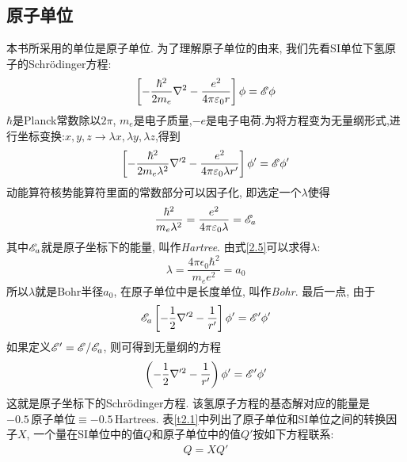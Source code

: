 \subsection{原子单位}
\label{sec2.1.1}
本书所采用的单位是原子单位. 
为了理解原子单位的由来,
我们先看SI单位下氢原子的Schr\"odinger方程:
\begin{align}
\label{2.3}
\left[-\frac{\hbar^2}{2m_e}\nabla^2-\frac{e^2}{4\pi\varepsilon_0r}\right]\phi=\mathscr{E}\phi
\end{align}
$ \hbar $是Planck常数除以$ 2\pi $, $ m_e $是电子质量,$ -e $是电子电荷.为将方程变为无量纲形式,进行坐标变换:$x,y,z\to\lambda x,\lambda y,\lambda z$,得到
\begin{equation}
\label{2.4}
\left[-\frac{\hbar^2}{2m_e\lambda^2}\nabla'^2-\frac{e^2}{4\pi\varepsilon_0\lambda r'}\right]\phi'=\mathscr{E}\phi'
\end{equation}
动能算符核势能算符里面的常数部分可以因子化,
即选定一个$ \lambda $使得
\begin{equation}
\label{2.5}
\frac{\hbar^2}{m_e\lambda^2}=\frac{e^2}{4\pi\varepsilon_0\lambda}=\mathscr{E}_a
\end{equation}
其中$ \mathscr{E}_a $就是原子坐标下的能量,
叫作\emph{Hartree}.
由式\ref{2.5}可以求得$ \lambda $:
\begin{equation}
\label{2.6}
\lambda=\frac{4\pi\epsilon_0\hbar^2}{m_ee^2}=a_0
\end{equation}
所以$ \lambda $就是Bohr半径$ a_0 $,
在原子单位中是长度单位,
叫作\emph{Bohr}.
最后一点,
由于
\begin{equation}
\mathscr{E}_a\left[-\frac{1}{2}\nabla'^2-\frac{1}{r'}\right]\phi'=\mathscr{E}'\phi'	
\end{equation}
如果定义$ \mathscr{E}'=\mathscr{E}/\mathscr{E}_a $,
则可得到无量纲的方程
\begin{equation}
\left(-\frac{1}{2}\nabla'^2-\frac{1}{r'}\right)\phi'=\mathscr{E}'\phi'
\end{equation}
这就是原子坐标下的Schr\"odinger方程.
该氢原子方程的基态解对应的能量是$-0.5\,\text{原子单位}\equiv -0.5\,\text{Hartrees}$. 
表\ref{t2.1}中列出了原子单位和SI单位之间的转换因子$ X $,
一个量在SI单位中的值$ Q $和原子单位中的值$ Q' $按如下方程联系:
\begin{eqnarray}
\label{2.9}
Q=XQ'
\end{eqnarray}

